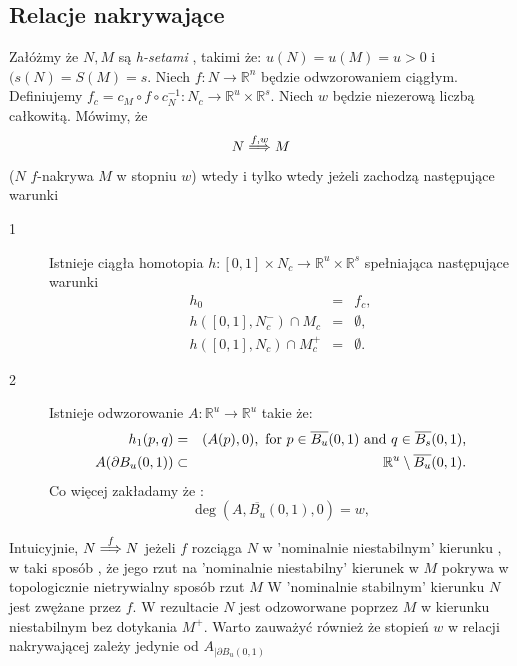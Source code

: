 \subsection{Relacje nakrywające}
\begin{definition} \cite{ZGi}
\label{def:covw} 
Załóżmy że $N,M$ są {\em h-setami } , takimi że: $u(N)=u(M)=u > 0$ i $(s(N)=S(M)=s$.
Niech $f:N \to {\mathbb R}^n$ będzie odwzorowaniem ciągłym. 
Definiujemy $f_c = c_M \circ f \circ c_N^{-1}: N_c \to {\mathbb R}^u \times {\mathbb R}^s $.
Niech $w$ będzie niezerową liczbą całkowitą. 
Mówimy, że 
\begin{displaymath}
  N\stackrel{f,w}{\Longrightarrow} M
\end{displaymath}
($N$ $f$-nakrywa $M$ w stopniu $w$) wtedy i tylko wtedy jeżeli zachodzą następujące warunki
\begin{description}
\item[1] 
   Istnieje ciągła homotopia $h:[0,1]\times N_c \to {\mathbb R}^u \times {\mathbb R}^s$ spełniająca następujące
   warunki
   \begin{eqnarray}
      h_0&=&f_c,  \label{eq:hc1} \\
      h([0,1],N_c^-) \cap M_c &=& \emptyset ,  \label{eq:hc2} \\
      h([0,1],N_c) \cap M_c^+ &=& \emptyset .\label{eq:hc3}
   \end{eqnarray}
\item[2] 
	Istnieje odwzorowanie $A:{\mathbb R} ^u \to {\mathbb R}^u$ takie że:
   \begin{eqnarray}
    h_1(p,q)&=&(A(p),0), \mbox{ for $p \in \overline{B_u}(0,1)$ and $ q \in
    \overline{B_s}(0,1)$,}\label{eq:hc4}\\
      A(\partial B_u(0,1)) &\subset & {\mathbb R}^u \setminus
      \overline{B_u}(0,1).  \label{eq:mapaway}
   \end{eqnarray}
  Co więcej zakładamy że :
\begin{displaymath}
  \deg(A,\overline {B_u}(0,1),0)=w,
\end{displaymath}
\end{description}
\end{definition}

Intuicyjnie, $N \stackrel{f}{\Longrightarrow} N$ jeżeli $f$ rozciąga $N$ w 
'nominalnie niestabilnym' kierunku , w taki sposób , że jego rzut na 
'nominalnie niestabilny' kierunek w $M$ pokrywa w topologicznie nietrywialny sposób rzut $M$
W 'nominalnie stabilnym' kierunku $N$ jest zwężane przez $f$. W rezultacie $N$ jest odzoworwane
poprzez $M$ w kierunku niestabilnym bez dotykania $M^+$. 
Warto zauważyć również że stopień $w$ w relacji nakrywającej zależy jedynie
od $A_{|\partial B_u(0,1)}$


